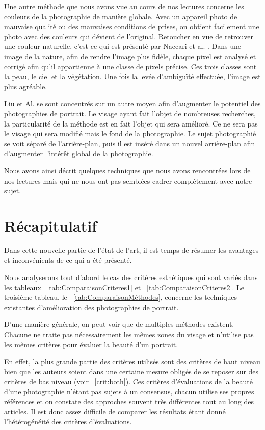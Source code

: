 \documentclass[11pt, french,screen]{report-rd-info}
\begin{document}
Une autre méthode que nous avons vue au cours de nos lectures concerne les couleurs de la photographie de manière globale. Avec un appareil photo de mauvaise qualité ou des mauvaises conditions de prises, on obtient facilement une photo avec des couleurs qui dévient de l’original. Retoucher en vue de retrouver une couleur naturelle, c'est ce qui est présenté par Naccari et al. \cite{Naccari}. Dans une image de la nature, afin de rendre l’image plus fidèle, chaque pixel est analysé et corrigé afin qu’il appartienne à une classe de pixels précise. Ces trois classes sont la peau, le ciel et la végétation. Une fois la levée d’ambiguïté effectuée, l’image est plus agréable.

Liu et Al. \cite{Liu2007} se sont concentrés sur un autre moyen afin d’augmenter le potentiel des photographies de portrait. Le visage ayant fait l’objet de nombreuses recherches, la particularité de la méthode est en fait l’objet qui sera amélioré. Ce ne sera pas le visage qui sera modifié mais le fond de la photographie. Le sujet photographié se voit séparé de l’arrière-plan, puis il est inséré dans un nouvel arrière-plan afin d’augmenter l’intérêt global de la photographie.

Nous avons ainsi décrit quelques techniques que nous avons rencontrées lors de nos lectures mais qui ne nous ont pas semblées cadrer complètement avec notre sujet.
\section{Récapitulatif}
Dans cette nouvelle partie de l'état de l'art, il est temps de résumer les avantages et inconvénients de ce qui a été présenté.

Nous analyserons tout d'abord le cas des critères esthétiques
qui sont variés dans les tableaux ~\ref{tab:ComparaisonCriteres1} et ~\ref{tab:ComparaisonCriteres2}. Le troisième tableau, le ~\ref{tab:ComparaisonMéthodes},
concerne les techniques existantes d'amélioration des photographies de portrait.

D’une manière générale, on peut voir que de multiples méthodes existent. Chacune ne traite pas nécessairement les mêmes zones du visage et n’utilise pas les mêmes critères pour évaluer la beauté d’un portrait.

En effet, la plus grande partie des critères utilisés sont des critères de haut niveau bien que les auteurs soient dans une certaine mesure obligés de se reposer sur des critères de bas niveau (voir ~\ref{crit:both}). Ces critères d’évaluations de la beauté d’une photographie n’étant pas sujets à un consensus, chacun utilise ses propres références et on constate des approches souvent très différentes tout au long des articles. Il est donc assez difficile de comparer les résultats étant donné l’hétérogénéité des critères d’évaluations.
\end{document}

